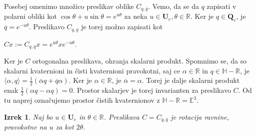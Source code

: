\documentclass[a4paper,12pt]{article}
\def\R{\mathbb{R}} %
\def\H{\mathbb{H}} %
\def\Qe{\textbf{Q}_{e}} %
\def\Ue{\textbf{U}_{e}} %
\newcommand{\conj}[1]{\overline{#1}}
\newtheorem{izrek}{Izrek}
\begin{document}
Posebej omenimo množico preslikav oblike $C_{q,\conj{q}}$. Vemo, da se da $q$ zapisati v polarni obliki kot
$\cos\theta + u\sin\theta = e^{u\theta}$ za neka $u \in \Ue, \theta \in \R$. Ker je $q \in \Qe$, je $\conj{q} = e^{-u\theta}$.
Preslikavo $C_{q, \conj{q}}$ je torej možno zapisati kot
\begin{center}
   $Cx := C_{q, \conj{q}} x = e^{u\theta}x e^{-u\theta}$.
\end{center}
Ker je $C$ ortogonalna preslikava, ohranja skalarni produkt. Spomnimo se, da so skalarni kvaternioni in čisti kvaternioni pravokotni,
saj ce $\alpha \in \R$ in $q \in \H - \R$, je $\langle \alpha, q\rangle = \frac{1}{2} (\conj{\alpha}q + \conj{q}\alpha)$. Ker je $\alpha \in \R$, je $\conj{\alpha} = \alpha$.
Torej je dalje skalarni produkt enak $\frac{1}{2}(\alpha q - \alpha q) = 0$. Prostor skalarjev je torej invarianten za preslikavo $C$.
Od tu naprej označujemo prostor čistih kvaternionov z $\H - \R = \mathbb{E}^3$.

\begin{izrek}
Naj bo $u \in \Ue$ in $\theta \in \R$. Preslikava $C = C_{q, \conj{q}}$ je rotacija ravnine, 
pravokotne na $u$ za kot $2\theta$.
\end{izrek}
\end{document}
